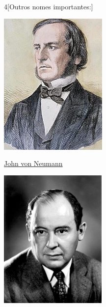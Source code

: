 \begin{multicols}{4}[Outros nomes importantes:]
\begin{center}
	\includegraphics[width=.8\columnwidth]{./IMG-GIT/CIENTISTAS/200px-George_Boole_color.jpg}
\end{center}

\vfill\null
\columnbreak
	
		
			\href{https://pt.wikipedia.org/wiki/John_von_Neumann}{John von Neumann}
			
\begin{center}
				\includegraphics[width=.8\columnwidth]{./IMG-GIT/CIENTISTAS/JohnvonNeumann-LosAlamos.jpg}
\end{center}
			

\end{multicols}
